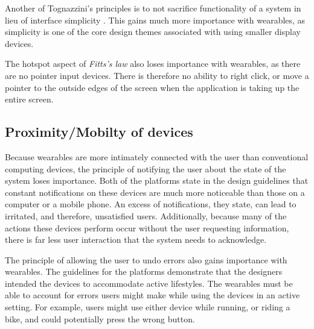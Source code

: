 \documentclass[12pt]{article}
\begin{document}
Another of Tognazzini's principles is to not sacrifice functionality of a system in lieu of interface simplicity \cite{tog}. This gains much more importance with wearables, as simplicity is one of the core design themes associated with using smaller display devices.

The hotspot aspect of \textit{Fitts's law} also loses importance with wearables, as there are no pointer input devices. There is therefore no ability to right click, or move a pointer to the outside edges of the screen when the application is taking up the entire screen.

\subsection{Proximity/Mobilty of devices}
Because wearables are more intimately connected with the user than conventional computing devices, the principle of notifying the user about the state of the system loses importance. Both of the platforms state in the design guidelines that constant notifications on these devices are much more noticeable than those on a computer or a mobile phone. An excess of notifications, they state, can lead to irritated, and therefore, unsatisfied users. Additionally, because many of the actions these devices perform occur without the user requesting information, there is far less user interaction that the system needs to acknowledge. 

The principle of allowing the user to undo errors also gains importance with wearables. The guidelines for the platforms demonstrate that the designers intended the devices to accommodate active lifestyles.  The wearables must be able to account for errors users might make while using the devices in an active setting. For example, users might use either device while running, or riding a bike, and could potentially press the wrong button.
\end{document}
